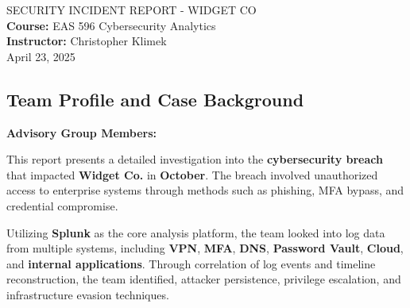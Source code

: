 \documentclass[11pt]{article}
\begin{document}
	\begin{titlepage}
		\centering
		\vspace*{8cm}
		{\huge SECURITY INCIDENT REPORT - WIDGET CO} \\
		\vspace{0.5cm}
		{\large \textbf{Course:} EAS 596 Cybersecurity Analytics} \\
		{\large \textbf{Instructor:} Christopher Klimek} \\
		{\large April 23, 2025} \\
	\end{titlepage}
	
	\subsection*{Team Profile and Case Background}
		
		\textbf{Advisory Group Members:}
		
		\hspace{1.5em}{Raghavi Ayyathurai}
		
		\vspace{0.2em}
		\hspace{1.5em}{Collin Heeb}
		
		\vspace{0.2em}
		\hspace{1.5em}{Kathiresan Kandasamy} 
		
		\vspace{0.2em}
		\hspace{1.5em}{Sharada Patnayakuni}
		
		\vspace{0.2em}
		\hspace{1.5em}{Naren Pindi} 
		
		\vspace{1em}
		\hspace{0.2em} This report presents a detailed investigation into the \textbf{cybersecurity breach} that impacted \textbf{Widget Co.} in \textbf{October}. The breach involved unauthorized access to enterprise systems through methods such as phishing, MFA bypass, and credential compromise.
		
		\vspace{1em}
		\hspace{0.2em}Utilizing \textbf{Splunk} as the core analysis platform, the team looked into log data from multiple systems, including \textbf{VPN}, \textbf{MFA}, \textbf{DNS}, \textbf{Password Vault}, \textbf{Cloud}, and \textbf{internal applications}. Through correlation of log events and timeline reconstruction, the team identified, attacker persistence, privilege escalation, and infrastructure evasion techniques. 
		
\end{document}
